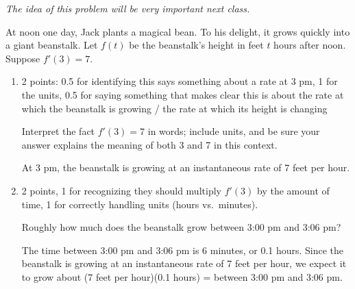 \documentclass{article}
\begin{document}
\begin{enumerate}[resume]

  \emph{The idea of this problem will be very important next class.}

  At noon one day, Jack plants a magical bean. To his delight, it grows quickly into a giant beanstalk. Let $f(t)$ be the beanstalk's height in feet $t$ hours after noon. Suppose $f'(3) = 7$.

  \begin{enumerate}

  \item

    \begin{grading}
      2 points: 0.5 for identifying this says something about a rate at 3 pm, 1 for the units, 0.5 for saying something that makes clear this is about the rate at which the beanstalk is growing / the rate at which its height is changing 
    \end{grading}

    \begin{problem}[\vfill]
      Interpret the fact $f'(3) = 7$ in words; include units, and be sure your answer explains the meaning of both 3 and 7 in this context. 
    \end{problem}

    \begin{solution}
      At 3 pm, the beanstalk is growing at an instantaneous rate of 7 feet per hour. 
    \end{solution}

  \item \label{beanstalk-concrete-example}

    \begin{grading}
      2 points, 1 for recognizing they should multiply $f'(3)$ by the amount of time, 1 for correctly handling units (hours vs.\ minutes). 
    \end{grading}

    \begin{problem}[\vfill] 
      Roughly how much does the beanstalk grow between 3:00 pm and 3:06 pm?
    \end{problem}

    \begin{solution}
      The time between 3:00 pm and 3:06 pm is 6 minutes, or 0.1 hours. 
      Since the beanstalk is growing at an instantaneous rate of 7 feet per hour, we expect it to grow about (7 feet per hour)(0.1 hours) =  between 3:00 pm and 3:06 pm. 
    \end{solution}


\end{enumerate}
\end{enumerate}
\end{document}

